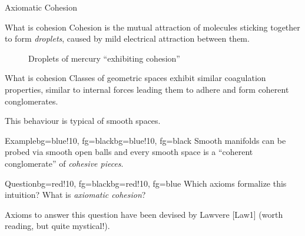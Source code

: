\documentclass[presentation,handout]{beamer}
\begin{document}
%
%
%
%
%
%
\begin{frame}
  \Huge
  \centering
  Axiomatic Cohesion
\end{frame}
%
%
%
%
%
%
%
\begin{frame}{What is cohesion}
  Cohesion is the mutual attraction of molecules sticking together to form \emph{droplets}, caused by mild electrical attraction between them.
  
  \begin{figure}[h!]
    \centering
    \caption{Droplets of mercury ``exhibiting cohesion''}
  \end{figure}
\end{frame}
%
%
%
%
%
%
%
\begin{frame}{What is cohesion}
  \onslide<+->
  Classes of geometric spaces exhibit similar coagulation properties, \onslide<+->similar to internal forces leading them to adhere and form \alert{coherent conglomerates}. 
  
  \onslide<+->This behaviour is typical of \alert{smooth spaces}.
  
  \medskip
  
  \onslide<+->\begin{variableblock}{Example}{bg=blue!10, fg=black}{bg=blue!10, fg=black}
    \alert{Smooth manifolds} can be probed via smooth open balls and every smooth space is a ``coherent conglomerate'' of \emph{cohesive pieces}.
  \end{variableblock}
  \vspace*{\fill}
  \onslide<+->\begin{variableblock}{Question}{bg=red!10, fg=black}{bg=red!10, fg=blue}
    Which axioms formalize this intuition? What is \emph{axiomatic cohesion}?
  \end{variableblock}
  
  \vspace*{\fill}
  Axioms to answer this question have been devised by Lawvere [Law1] (worth reading, but quite mystical!).
\end{frame}
%
%
%
%
%
%
%
\end{document}
